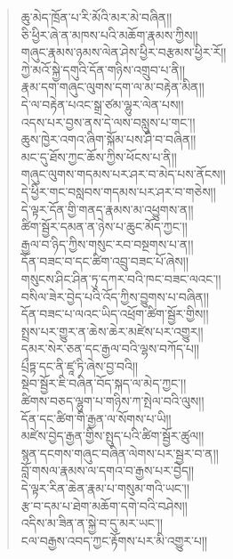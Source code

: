 \documentclass{article}
\begin{document}
\begin{verse}
    ཆུ་མེད་ཁྲོན་པ་རི་མོའི་མར་མེ་བཞིན།། \\
    ཅི་ཕྱིར་ཞེ་ན་མཁས་པའི་མཆོག་རྣམས་ཀྱིས།། \\
    གཞུང་རྣམས་ཉམས་ལེན་ཤེས་ཕྱིར་བརྩམས་ཕྱིར་རོ།། \\
    ཀྱེ་མའོ་སྐྱེ་དགུའི་དོན་གཉིས་འགྲུབ་པ་ནི།། \\
    རྣམ་དག་གཞུང་ལུགས་དག་ལ་མ་བརྟེན་མིན།། \\
    དེ་ལ་བརྟེན་པའང་སྒྲ་ཙམ་ལྷུར་ལེན་པས།། \\
    འདས་པར་བྱས་ནས་དེ་ལས་བསླུས་པ་གང༌།། \\
    ཆུས་ཁྱེར་འགའ་ཞིག་སྐོམ་པས་ཤི་བ་བཞིན།། \\
    མང་དུ་ཐོས་ཀྱང་ཆོས་ཀྱིས་ཕོངས་པ་ནི།། \\
    གཞུང་ལུགས་གདམས་པར་ཤར་བ་མེད་པས་ནོངས།། \\
    དེ་ཕྱིར་གང་བསླབས་གདམས་པར་ཤར་བ་གཅེས།། \\
    དེ་ལྟར་དོན་གྱི་གནད་རྣམས་མ་འཕྱུགས་ན།། \\
    ཚིག་སྦྱོར་དམན་ན་ཉེས་པ་ཆུང་མོད་ཀྱང༌།། \\
    རྒྱལ་བ་ཉིད་ཀྱིས་གསུང་རབ་བསྔགས་པ་ན།། \\
    དོན་བཟང་བ་དང་ཚིག་འབྲུ་བཟང་པོ་ཞེས།། \\
    གསུངས་ཤིང་ཤིན་ཏུ་དཀར་བའི་ཁང་བཟང་ལའང༌།། \\
    བསིལ་ཟེར་བྱེད་པའི་འོད་ཀྱིས་བྱུགས་པ་བཞིན།། \\
    དོན་བཟང་པ་ལའང་ཡིད་འཕྲོག་ཚིག་སྦྱོར་གྱིས།། \\
    སྤྲས་པར་གྱུར་ན་ཆེས་ཆེར་མཛེས་པར་འགྱུར།། \\
    དམར་སེར་ཅན་དང་རྒྱལ་བའི་ལྷས་བཀོད་པ།། \\
    པྲྀཏྟ་དང་ནི་ཛཱ་ཏི་ཞེས་བྱ་བའི།། \\
    སྡེབ་སྦྱོར་ཇི་བཞིན་བོད་སྐད་ལ་མེད་ཀྱང༌།། \\
    ཚིགས་བཅད་ལྷུག་པ་གཉིས་ཀ་སྤེལ་བའི་ལུས།། \\
    དོན་དང་ཚིག་གི་རྒྱན་ལ་སོགས་པ་ཡི།། \\
    མཛེས་བྱེད་རྒྱན་གྱིས་སྤུད་པའི་ཚིག་སྦྱོར་ཚུལ།། \\
    སྙན་དངགས་གཞུང་བཞིན་ལེགས་པར་སྦྱར་བ་ན།། \\
    བློ་གསལ་རྣམས་ལ་དགའ་བ་རྒྱས་པར་བྱེད།། \\
    དེ་ལྟར་རིན་ཆེན་རྣམ་པ་གསུམ་གའི་ཡང༌།། \\
    རྩ་བ་དམ་པ་ཐེག་མཆོག་དགེ་བའི་བཤེས།། \\
    འདིས་མ་ཟིན་ན་སྐྱེ་བ་དུ་མར་ཡང༌།། \\
    ངལ་བརྒྱས་འབད་ཀྱང་རྟོགས་པར་མི་འགྱུར་པ།། \\

\end{verse}
\end{document}
